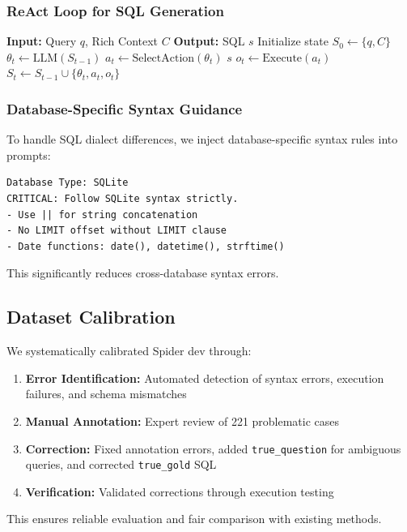 \subsubsection{ReAct Loop for SQL Generation}

\begin{algorithm}[h]
\caption{ReAct SQL Generation}
\begin{algorithmic}[1]
\STATE \textbf{Input:} Query $q$, Rich Context $C$
\STATE \textbf{Output:} SQL $s$
\STATE Initialize state $S_0 \leftarrow \{q, C\}$
    \STATE $\theta_t \leftarrow \text{LLM}(S_{t-1})$ 
    \STATE $a_t \leftarrow \text{SelectAction}(\theta_t)$ 
        \RETURN $s$
    \ENDIF
    \STATE $o_t \leftarrow \text{Execute}(a_t)$ 
    \STATE $S_t \leftarrow S_{t-1} \cup \{\theta_t, a_t, o_t\}$
\ENDFOR
\end{algorithmic}
\end{algorithm}

\subsubsection{Database-Specific Syntax Guidance}

To handle SQL dialect differences, we inject database-specific syntax rules into prompts:

\begin{verbatim}
Database Type: SQLite
CRITICAL: Follow SQLite syntax strictly.
- Use || for string concatenation
- No LIMIT offset without LIMIT clause
- Date functions: date(), datetime(), strftime()
\end{verbatim}

This significantly reduces cross-database syntax errors.

\subsection{Dataset Calibration}

We systematically calibrated Spider dev through:
\begin{enumerate}
    \item \textbf{Error Identification:} Automated detection of syntax errors, execution failures, and schema mismatches
    \item \textbf{Manual Annotation:} Expert review of 221 problematic cases
    \item \textbf{Correction:} Fixed annotation errors, added \texttt{true\_question} for ambiguous queries, and corrected \texttt{true\_gold} SQL
    \item \textbf{Verification:} Validated corrections through execution testing
\end{enumerate}

This ensures reliable evaluation and fair comparison with existing methods.
